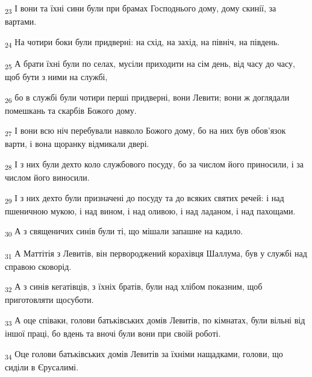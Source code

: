 \begin{tcolorbox}
\textsubscript{23} І вони та їхні сини були при брамах Господнього дому, дому скинії, за вартами.
\end{tcolorbox}
\begin{tcolorbox}
\textsubscript{24} На чотири боки були придверні: на схід, на захід, на північ, на південь.
\end{tcolorbox}
\begin{tcolorbox}
\textsubscript{25} А брати їхні були по селах, мусіли приходити на сім день, від часу до часу, щоб бути з ними на службі,
\end{tcolorbox}
\begin{tcolorbox}
\textsubscript{26} бо в службі були чотири перші придверні, вони Левити; вони ж доглядали помешкань та скарбів Божого дому.
\end{tcolorbox}
\begin{tcolorbox}
\textsubscript{27} І вони всю ніч перебували навколо Божого дому, бо на них був обов'язок варти, і вона щоранку відмикали двері.
\end{tcolorbox}
\begin{tcolorbox}
\textsubscript{28} І з них були дехто коло службового посуду, бо за числом його приносили, і за числом його виносили.
\end{tcolorbox}
\begin{tcolorbox}
\textsubscript{29} І з них дехто були призначені до посуду та до всяких святих речей: і над пшеничною мукою, і над вином, і над оливою, і над ладаном, і над пахощами.
\end{tcolorbox}
\begin{tcolorbox}
\textsubscript{30} А з священичих синів були ті, що мішали запашне на кадило.
\end{tcolorbox}
\begin{tcolorbox}
\textsubscript{31} А Маттітія з Левитів, він первороджений корахівця Шаллума, був у службі над справою сковорід.
\end{tcolorbox}
\begin{tcolorbox}
\textsubscript{32} А з синів кегатівців, з їхніх братів, були над хлібом показним, щоб приготовляти щосуботи.
\end{tcolorbox}
\begin{tcolorbox}
\textsubscript{33} А оце співаки, голови батьківських домів Левитів, по кімнатах, були вільні від іншої праці, бо вдень та вночі були вони при своїй роботі.
\end{tcolorbox}
\begin{tcolorbox}
\textsubscript{34} Оце голови батьківських домів Левитів за їхніми нащадками, голови, що сиділи в Єрусалимі.
\end{tcolorbox}
